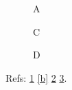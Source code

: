 \documentclass{article}
\begin{document}
\begin{figure}\caption{A}\label{a}\end{figure}
\begin{figure}\ContinuedFloat\caption{B}\label{b}\caption{C}\label{c}\end{figure}
\begin{figure}\caption{D}\label{d}\end{figure}
Refs: \ref{a} \ref{b} \ref{c} \ref{d}.
\end{document}
